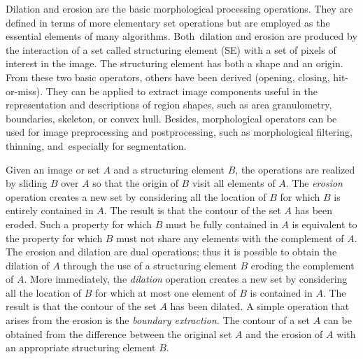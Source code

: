 Dilation and erosion are the basic morphological processing operations. They are defined in terms of more elementary set operations but are employed as the essential elements of many algorithms. Both~dilation and erosion are produced by the interaction of a set called structuring element (SE) with a set of pixels of interest in the image. The structuring element has both a shape and an origin. From these two basic operators, others have been derived (opening, closing, hit-or-miss). They can be applied to extract image components useful in the representation and descriptions of region shapes, such as area granulometry, boundaries, skeleton, or convex hull. Besides, morphological operators can be used for image preprocessing and postprocessing, such as morphological filtering, thinning, and~especially for segmentation.

Given an image or set $A$ and a structuring element $B$, the operations are realized by sliding $B$ over $A$ so that the origin of $B$ visit all elements of $A$. The \textit{erosion} operation creates a new set by considering all the location of $B$ for which $B$ is entirely contained in $A$. The result is that the contour of the set $A$ has been eroded. Such a property for which $B$ must be fully contained in $A$ is equivalent to the property for which $B$ must not share any elements with the complement of $A$. The erosion and dilation are dual operations; thus it is possible to obtain the dilation of $A$ through the use of a structuring element $B$ eroding the complement of $A$. More immediately, the \textit{dilation} operation creates a new set by considering all the location of $B$ for which at most one element of $B$ is contained in $A$. The result is that the contour of the set $A$ has been dilated. A simple operation that arises from the erosion is the \textit{boundary extraction}. The contour of a set $A$ can be obtained from the difference between the original set $A$ and the erosion of $A$ with an appropriate structuring element $B$.

